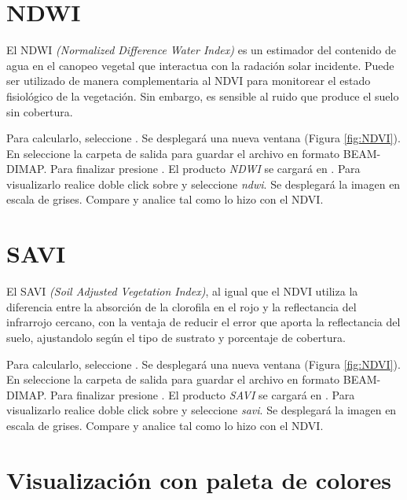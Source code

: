 \section{NDWI}

El NDWI \emph{(Normalized Difference Water Index)} es un estimador del contenido de agua en el canopeo vegetal que interactua con la radación solar incidente. Puede ser utilizado de manera complementaria al NDVI para monitorear el estado fisiológico de la vegetación. Sin embargo, es sensible al ruido que produce el suelo sin cobertura.

Para calcularlo, seleccione .  Se desplegará una nueva ventana (Figura \ref{fig:NDVI}). En  seleccione la carpeta de salida para guardar el archivo en formato BEAM-DIMAP. Para finalizar presione . El producto \emph{NDWI} se cargará en . Para visualizarlo realice doble click sobre  y seleccione \emph{ndwi}. Se desplegará la imagen en escala de grises. Compare y analice tal como lo hizo con el NDVI.

\section{SAVI}

El SAVI \emph{(Soil Adjusted Vegetation Index)}, al igual que el NDVI utiliza la diferencia entre la absorción de la clorofila en el rojo y la reflectancia del infrarrojo cercano, con la ventaja de reducir el error que aporta la reflectancia del suelo, ajustandolo según el tipo de sustrato y porcentaje de cobertura.

Para calcularlo, seleccione .  Se desplegará una nueva ventana (Figura \ref{fig:NDVI}). En  seleccione la carpeta de salida para guardar el archivo en formato BEAM-DIMAP. Para finalizar presione . El producto \emph{SAVI} se cargará en . Para visualizarlo realice doble click sobre  y seleccione \emph{savi}. Se desplegará la imagen en escala de grises. Compare y analice tal como lo hizo con el NDVI.

\section{Visualización con paleta de colores}


